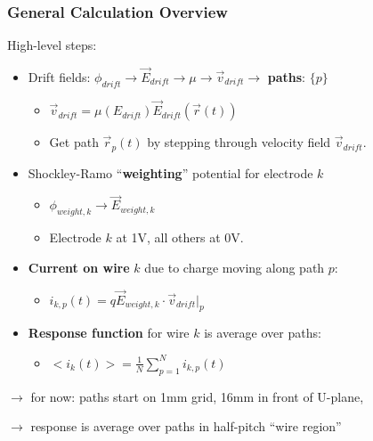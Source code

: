 \documentclass[xcolor=dvipsnames]{beamer}
\begin{document}
\begin{frame}
  \frametitle{General Calculation Overview}
  High-level steps:
  \begin{itemize}
  \item Drift fields: $\phi_{drift} \to \vec{E}_{drift} \to \mu \to \vec{v}_{drift} \to$ \textbf{paths}: $\{p\}$
    \begin{itemize}\footnotesize
    \item $\vec{v}_{drift} = \mu(E_{drift}) \vec{E}_{drift}(\vec{r}(t))$
    \item Get path $\vec{r}_p(t)$ by stepping through velocity field $\vec{v}_{drift}$.
    \end{itemize}

  \item Shockley-Ramo ``\textbf{weighting}'' potential for electrode $k$
    \begin{itemize}\footnotesize
    \item $\phi_{weight,k} \to \vec{E}_{weight,k}$
    \item Electrode $k$ at 1V, all others at 0V.
    \end{itemize}
  \item \textbf{Current on wire} $k$ due to charge moving along path $p$: 
    \begin{itemize}\footnotesize
    \item $i_{k,p}(t) = q \vec{E}_{weight,k} \cdot \vec{v}_{drift}|_p$
    \end{itemize}
  \item \textbf{Response function} for wire $k$ is average over paths: 
    \begin{itemize}\footnotesize
    \item $<i_{k}(t)> = \frac{1}{N}\sum_{p=1}^N i_{k,p}(t)$
    \end{itemize}
  \end{itemize}
  \vfill
  \footnotesize
  $\rightarrow$ for now: paths start on 1mm grid, 16mm in front of
  U-plane, 

  $\rightarrow$ response is average over paths in half-pitch ``wire region''
\end{frame}
\end{document}
